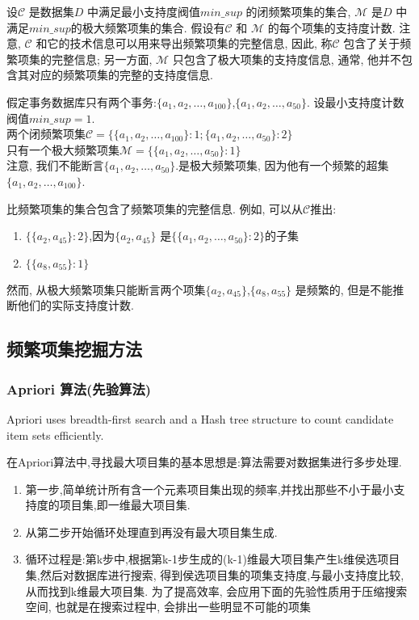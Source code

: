 \documentclass{article}
\begin{document}
设$\mathcal{C}$ 是数据集$D$ 中满足最小支持度阀值$min\_sup$ 的闭频繁项集的集合, $\mathcal{M}$ 是$D$ 中满足$min\_sup$的极大频繁项集的集合.
假设有$\mathcal{C}$ 和 $\mathcal{M}$ 的每个项集的支持度计数.
注意, $\mathcal{C}$ 和它的技术信息可以用来导出频繁项集的完整信息, 因此, 称$\mathcal{C}$ 包含了关于频繁项集的完整信息;
另一方面, $\mathcal{M}$ 只包含了极大项集的支持度信息, 通常, 他并不包含其对应的频繁项集的完整的支持度信息.

\begin{example}
假定事务数据库只有两个事务:$\{a_1,a_2,\dots,a_{100}\}$,$\{a_1,a_2,\dots,a_{50}\}$.
设最小支持度计数阀值$min\_sup = 1$.\\
两个闭频繁项集$\mathcal{C} = \{\{a_1,a_2,\dots,a_{100}\}:1;\{a_1,a_2,\dots,a_{50}\}:2\}$ \\
只有一个极大频繁项集$\mathcal{M} = \{\{a_1,a_2,\dots,a_{50}\}:1\}$ \\
注意, 我们不能断言$\{a_1,a_2,\dots,a_{50}\}$.是极大频繁项集, 因为他有一个频繁的超集$\{a_1,a_2,\dots,a_{100}\}$.\par
比频繁项集的集合包含了频繁项集的完整信息. 例如, 可以从$\mathcal{C}$推出:
\begin{enumerate}
	\item $\{\{a_2,a_{45}\}:2\}$,因为$\{a_2,a_{45}\}$ 是$\{\{a_1,a_2,\dots,a_{50}\}:2\}$的子集
	\item $\{\{a_8,a_{55}\}:1\}$
\end{enumerate}
然而, 从极大频繁项集只能断言两个项集$\{a_2,a_{45}\}$,$\{a_8,a_{55}\}$ 是频繁的, 但是不能推断他们的实际支持度计数.
\end{example}

\subsection{频繁项集挖掘方法}
\subsubsection{Apriori 算法(先验算法)}
Apriori uses breadth-first search and a Hash tree structure to count candidate item sets efficiently.

在Apriori算法中,寻找最大项目集的基本思想是:算法需要对数据集进行多步处理.
\begin{enumerate}
	\item 第一步,简单统计所有含一个元素项目集出现的频率,并找出那些不小于最小支持度的项目集,即一维最大项目集.
	\item 从第二步开始循环处理直到再没有最大项目集生成.
	\item 循环过程是:第k步中,根据第k-1步生成的(k-1)维最大项目集产生k维侯选项目集,然后对数据库进行搜索,
			得到侯选项目集的项集支持度,与最小支持度比较,从而找到k维最大项目集. 为了提高效率, 会应用下面的先验性质用于压缩搜索空间,
			也就是在搜索过程中, 会排出一些明显不可能的项集
\end{enumerate}
\end{document}
